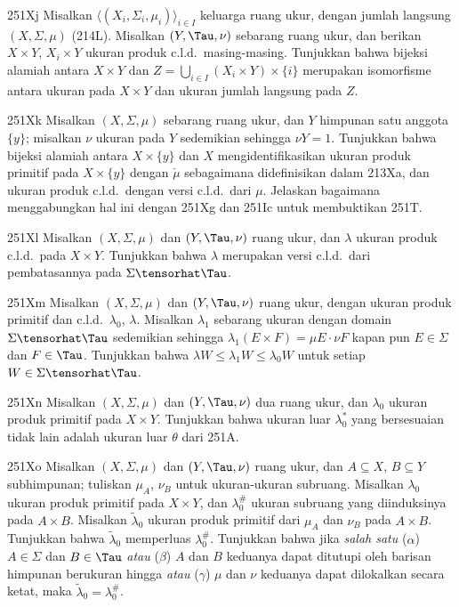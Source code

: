{\sqheader 251Xj Misalkan
$\langle(X_i,\Sigma_i,\mu_i)\rangle_{i\in I}$ keluarga ruang
ukur, dengan jumlah langsung $(X,\Sigma,\mu)$
(214L). Misalkan $(Y,\Tau,\nu)$ sebarang ruang ukur, dan berikan $X\times Y$,
$X_i\times Y$ ukuran produk c.l.d.\ masing-masing. Tunjukkan bahwa bijeksi
alamiah antara $X\times Y$ dan
$Z=\bigcup_{i\in I}(X_i\times Y)\times\{i\}$
merupakan isomorfisme antara ukuran pada $X\times Y$ dan
ukuran jumlah langsung pada $Z$.

\sqheader 251Xk Misalkan $(X,\Sigma,\mu)$ sebarang ruang ukur, dan
$Y$ himpunan satu anggota
$\{y\}$; misalkan $\nu$ ukuran pada $Y$ sedemikian sehingga $\nu Y=1$.
Tunjukkan bahwa bijeksi alamiah antara $X\times\{y\}$ dan $X$
mengidentifikasikan ukuran produk primitif pada $X\times\{y\}$ dengan
$\check\mu$ sebagaimana didefinisikan dalam 213Xa, dan ukuran produk c.l.d.\ dengan
versi c.l.d.\
dari $\mu$. Jelaskan bagaimana menggabungkan hal ini dengan 251Xg dan
251Ic untuk membuktikan 251T.

\sqheader 251Xl Misalkan $(X,\Sigma,\mu)$ dan $(Y,\Tau,\nu)$ ruang
ukur, dan $\lambda$ ukuran produk c.l.d.\ pada $X\times Y$. Tunjukkan
bahwa $\lambda$ merupakan versi c.l.d.\ dari pembatasannya pada
$\Sigma\tensorhat\Tau$.

\spheader 251Xm Misalkan $(X,\Sigma,\mu)$ dan $(Y,\Tau,\nu)$ ruang
ukur, dengan ukuran produk primitif dan c.l.d.\ $\lambda_0$,
$\lambda$. Misalkan
$\lambda_1$ sebarang ukuran dengan domain $\Sigma\tensorhat\Tau$ sedemikian sehingga
$\lambda_1(E\times F)=\mu E\cdot\nu F$ kapan pun $E\in\Sigma$ dan
$F\in\Tau$. Tunjukkan bahwa $\lambda W\le\lambda_1W\le\lambda_0W$ untuk setiap
$W\in\Sigma\tensorhat\Tau$.

\spheader 251Xn Misalkan $(X,\Sigma,\mu)$ dan $(Y,\Tau,\nu)$ dua ruang
ukur, dan $\lambda_0$ ukuran produk primitif pada $X\times Y$.
Tunjukkan bahwa ukuran luar $\lambda_0^*$ yang bersesuaian tidak lain adalah
ukuran luar $\theta$ dari 251A.

\spheader 251Xo Misalkan $(X,\Sigma,\mu)$ dan $(Y,\Tau,\nu)$
ruang ukur, dan $A\subseteq X$, $B\subseteq
Y$ subhimpunan; tuliskan $\mu_A$, $\nu_B$ untuk ukuran-ukuran
subruang. Misalkan $\lambda_0$ ukuran produk primitif
pada $X\times Y$, dan $\lambda_0^{\#}$
ukuran subruang yang diinduksinya pada $A\times B$. Misalkan $\tilde\lambda_0$
ukuran produk primitif dari
$\mu_A$ dan $\nu_B$ pada $A\times B$. Tunjukkan bahwa $\tilde\lambda_0$
memperluas $\lambda_0^{\#}$.
Tunjukkan bahwa jika
{\it salah satu} ($\alpha$) $A\in\Sigma$ dan $B\in\Tau$
{\it atau} ($\beta$) $A$ dan $B$ keduanya dapat ditutupi oleh barisan himpunan
berukuran hingga
{\it atau} ($\gamma$) $\mu$ dan $\nu$ keduanya dapat dilokalkan secara ketat,
maka $\tilde\lambda_0=\lambda_0^{\#}$.

}
